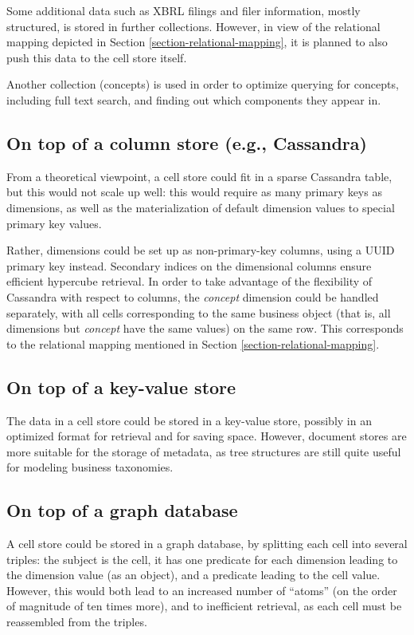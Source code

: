 \documentclass{acm_proc_article-sp}
\begin{document}
Some additional data such as XBRL filings and filer information, mostly structured, is stored in further collections. However, in view of the relational mapping depicted in Section \ref{section-relational-mapping}, it is planned to also push this data to the cell store itself.

Another collection (concepts) is used in order to optimize querying for concepts, including full text search, and finding out which components they appear in.

\subsection{On top of a column store (e.g., Cassandra)}

From a theoretical viewpoint, a cell store could fit in a sparse Cassandra table, but this would not scale up well: this would require as many primary keys as dimensions, as well as the materialization of default dimension values to special primary key values.

Rather, dimensions could be set up as non-primary-key columns, using a UUID primary key instead. Secondary indices on the dimensional columns ensure efficient hypercube retrieval. In order to take advantage of the flexibility of Cassandra with respect to columns, the \emph{concept} dimension could be handled separately, with all cells corresponding to the same business object (that is, all dimensions but \emph{concept} have the same values) on the same row. This corresponds to the relational mapping mentioned in Section \ref{section-relational-mapping}.

\subsection{On top of a key-value store}

The data in a cell store could be stored in a key-value store, possibly in an optimized format for retrieval and for saving space. However, document stores are more suitable for the storage of metadata, as tree structures are still quite useful for modeling business taxonomies.

\subsection{On top of a graph database}

A cell store could be stored in a graph database, by splitting each cell into several triples: the subject is the cell, it has one predicate for each dimension leading to the dimension value (as an object), and a predicate leading to the cell value. However, this would both lead to an increased number of ``atoms'' (on the order of magnitude of ten times more), and to inefficient retrieval, as each cell must be reassembled from the triples.
\end{document}
